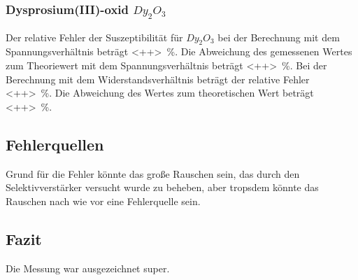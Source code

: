 \subsubsection{Dysprosium(III)-oxid $Dy_2 O_3$}
Der relative Fehler der Suszeptibilität für $Dy_2 O_3$ bei der Berechnung mit dem Spannungsverhältnis beträgt \SI{<++>}{\percent}. 
Die Abweichung des gemessenen Wertes zum Theoriewert mit dem Spannungsverhältnis beträgt \SI{<++>}{\percent}.
\newline
Bei der Berechnung mit dem Widerstandsverhältnis beträgt der relative Fehler \SI{<++>}{\percent}.
Die Abweichung des Wertes zum theoretischen Wert beträgt \SI{<++>}{\percent}.


\subsection{Fehlerquellen}
Grund für die Fehler könnte das große Rauschen sein, das durch den Selektivverstärker versucht wurde zu beheben, aber tropsdem könnte das Rauschen nach wie vor eine Fehlerquelle sein. 

\subsection{Fazit}
Die Messung war ausgezeichnet super.